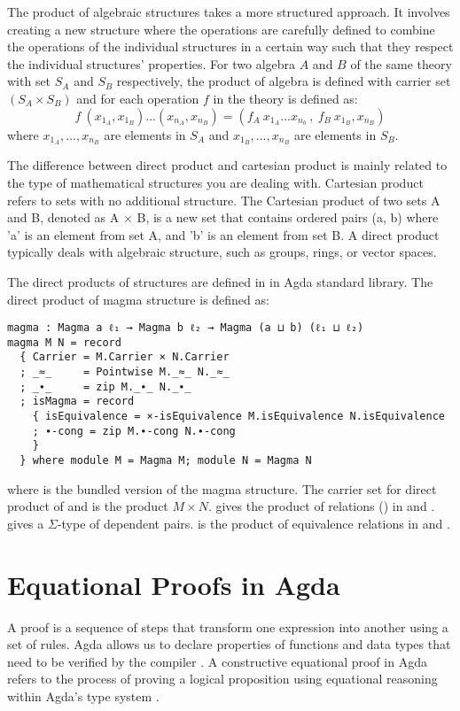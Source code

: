 The product of algebraic structures takes a more structured approach. It
involves creating a new structure where the operations are carefully defined to
combine the operations of the individual structures in a certain way such that
they respect the individual structures' properties. For two algebra $A$ and $B$
of the same theory with set $S_A$ and $S_B$ respectively, the product of algebra
is defined with carrier set $(S_A \times S_B)$ and for each operation $f$ in the
theory is defined as:
\[f\ (x_{1_A},x_{1_B})...(x_{n_A},x_{n_B}) = (f_A\ x_{1_A}...x_{n_b}\ ,\ f_B\
x_{1_B},x_{n_B} )\] where $x_{1_A},...,x_{n_B}$ are elements in $S_A$ and
$x_{1_B},...,x_{n_B}$ are elements in $S_B$. 

The difference between direct product and cartesian product is mainly related
to the type of mathematical structures you are dealing with. Cartesian product
refers to sets with no additional structure. The Cartesian product of two sets A
and B, denoted as A × B, is a new set that contains ordered pairs (a, b) where
'a' is an element from set A, and 'b' is an element from set B. A direct product
typically deals with algebraic structure, such as groups, rings, or vector
spaces.

The direct products of structures are defined in
 in Agda standard library. The direct
product of magma structure is defined as:

\begin{verbatim}
magma : Magma a ℓ₁ → Magma b ℓ₂ → Magma (a ⊔ b) (ℓ₁ ⊔ ℓ₂)
magma M N = record
  { Carrier = M.Carrier × N.Carrier
  ; _≈_     = Pointwise M._≈_ N._≈_
  ; _∙_     = zip M._∙_ N._∙_
  ; isMagma = record
    { isEquivalence = ×-isEquivalence M.isEquivalence N.isEquivalence
    ; ∙-cong = zip M.∙-cong N.∙-cong
    }
  } where module M = Magma M; module N = Magma N
\end{verbatim}

where  is the bundled version of the magma structure. The carrier
set for direct product of  and  is the product $M \times N$.
\inline{Pointwise} gives the product of relations (\inline{_≈_}) in 
and \inline{N}. \inline{zip} gives a $\Sigma$-type of dependent pairs.
\inline{×-isEquivalence} is the product of equivalence relations in \inline{M}
and \inline{N}.

\section{Equational Proofs in Agda}
A proof is a sequence of steps that transform one expression into another using
a set of rules. Agda allows us to declare properties of functions and data types
that need to be verified by the compiler \cite{kidney2020finiteness}. A
constructive equational proof in Agda refers to the process of proving a logical
proposition using equational reasoning within Agda's type system
\cite{murray2022constructive}. 

